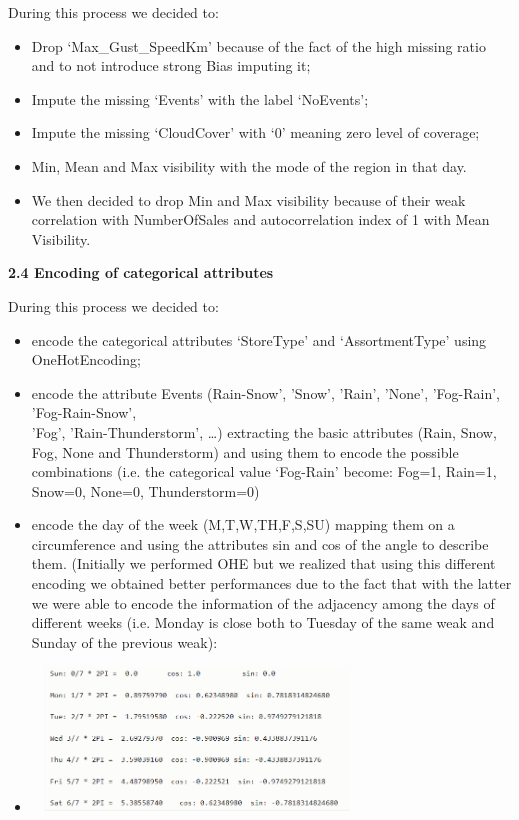 \documentclass[]{article}
\begin{document}
During this process we decided to:

\begin{itemize}
\item
  Drop `Max\_Gust\_SpeedKm' because of the fact of the high missing
  ratio and to not introduce strong Bias imputing it;
\item
  Impute the missing `Events' with the label `NoEvents';
\item
  Impute the missing `CloudCover' with `0' meaning zero level of
  coverage;
\item
  Min, Mean and Max visibility with the mode of the region in that day.
\item
  We then decided to drop Min and Max visibility because of their weak
  correlation with NumberOfSales and autocorrelation index of 1 with
  Mean Visibility.
\end{itemize}

\textbf{2.4 Encoding of categorical attributes}

During this process we decided to:

\begin{itemize}
\item
  encode the categorical attributes `StoreType' and `AssortmentType'
  using OneHotEncoding;
\item
  encode the attribute Events (Rain-Snow', 'Snow', 'Rain', 'None',
  'Fog-Rain', 'Fog-Rain-Snow',\\
  'Fog', 'Rain-Thunderstorm', \ldots{}) extracting the basic attributes
  (Rain, Snow, Fog, None and Thunderstorm) and using them to encode the
  possible combinations (i.e. the categorical value `Fog-Rain' become:
  Fog=1, Rain=1, Snow=0, None=0, Thunderstorm=0)
\item
  encode the day of the week (M,T,W,TH,F,S,SU) mapping them on a
  circumference and using the attributes sin and cos of the angle to
  describe them. (Initially we performed OHE but we realized that using
  this different encoding we obtained better performances due to the
  fact that with the latter we were able to encode the information of
  the adjacency among the days of different weeks (i.e. Monday is close
  both to Tuesday of the same weak and Sunday of the previous weak):
\item
  \includegraphics[width=3.45044in,height=1.52000in]{media/image7.png}
\end{itemize}
\end{document}
